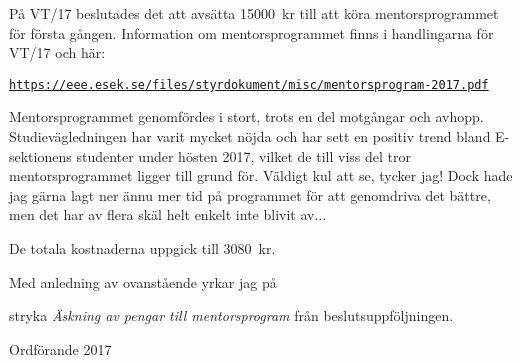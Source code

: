 \documentclass[../_main/handlingar.tex]{subfiles}
\begin{document}

På VT/17 beslutades det att avsätta \SI{15000}{kr} till att köra mentorsprogrammet för första gången. Information om mentorsprogrammet finns i handlingarna för VT/17 och här:

\href{https://eee.esek.se/files/styrdokument/misc/mentorsprogram-2017.pdf}{\texttt{https://eee.esek.se/files/styrdokument/misc/mentorsprogram-2017.pdf}}

Mentorsprogrammet genomfördes i stort, trots en del motgångar och avhopp. Studievägledningen har varit mycket nöjda och har sett en positiv trend bland E-sektionens studenter under hösten 2017, vilket de till viss del tror mentorsprogrammet ligger till grund för. Väldigt kul att se, tycker jag! Dock hade jag gärna lagt ner ännu mer tid på programmet för att genomdriva det bättre, men det har av flera skäl helt enkelt inte blivit av...

De totala kostnaderna uppgick till \SI{3080}{kr}.

Med anledning av ovanstående yrkar jag på

\begin{attsatser}
    \att stryka \emph{Äskning av pengar till mentorsprogram} från beslutsuppföljningen.
\end{attsatser}

\begin{signatures}{1}
    \mvh
    \signature{Erik Månsson}{Ordförande 2017}
\end{signatures}
\end{document}
